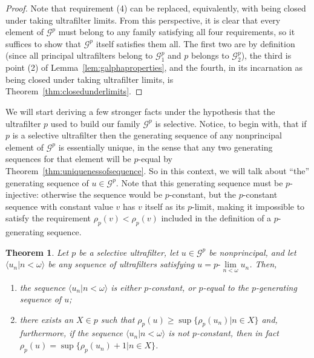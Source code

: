 \documentclass[10pt]{amsart}
\newcommand{\ulim}[2]{#1\text{-}\lim\limits_{#2<\omega}}
\newtheorem{theorem}{Theorem}[section]
\theoremstyle{definition}
\theoremstyle{remark}
\begin{document}
\begin{proof}
    Note that requirement (4) can be replaced, equivalently, with being closed under taking ultrafilter limits. From this perspective, it is clear that every element of $\mathscr G^p$ must belong to any family satisfying all four requirements, so it suffices to show that $\mathscr G^p$ itself satisfies them all. The first two are by definition (since all principal ultrafilters belong to $\mathscr G_1^p$ and $p$ belongs to $\mathscr G_2^p$), the third is point (2) of Lemma~\ref{lem:galphaproperties}, and the fourth, in its incarnation as being closed under taking ultrafilter limits, is Theorem~\ref{thm:closedunderlimits}.
\end{proof}

We will start deriving a few stronger facts under the hypothesis that the ultrafilter $p$ used to build our family $\mathscr G^p$ is selective. Notice, to begin with, that if $p$ is a selective ultrafilter then the generating sequence of any nonprincipal element of $\mathscr G^p$ is essentially unique, in the sense that any two generating sequences for that element will be $p$-equal by Theorem~\ref{thm:uniquenessofsequence}. So in this context, we will talk about ``the'' generating sequence of $u\in\mathscr G^p$. Note that this generating sequence must be $p$-injective: otherwise the sequence would be $p$-constant, but the $p$-constant sequence with constant value $v$ has $v$ itself as its $p$-limit, making it impossible to satisfy the requirement $\rho_p(v)<\rho_p(v)$ included in the definition of a $p$-generating sequence.

\begin{theorem}\label{thm:ifpselective}
    Let $p$ be a selective ultrafilter, let $u\in\mathscr G^p$ be nonprincipal, and let $\langle u_n\big|n<\omega\rangle$ be any sequence of ultrafilters satisfying $u=\ulim{p}{n}u_n$.  Then,
    \begin{enumerate}
        \item the sequence $\langle u_n\big|n<\omega\rangle$ is either $p$-constant, or $p$-equal to the $p$-generating sequence of $u$;
        \item there exists an $X\in p$ such that $\rho_p(u)\geq\sup\{\rho_p(u_n)\big|n\in X\}$ and, furthermore, if the sequence $\langle u_n\big|n<\omega\rangle$ is not $p$-constant, then in fact $\rho_p(u)=\sup\{\rho_p(u_n)+1\big|n\in X\}$.
    \end{enumerate}
\end{theorem}
\end{document}
